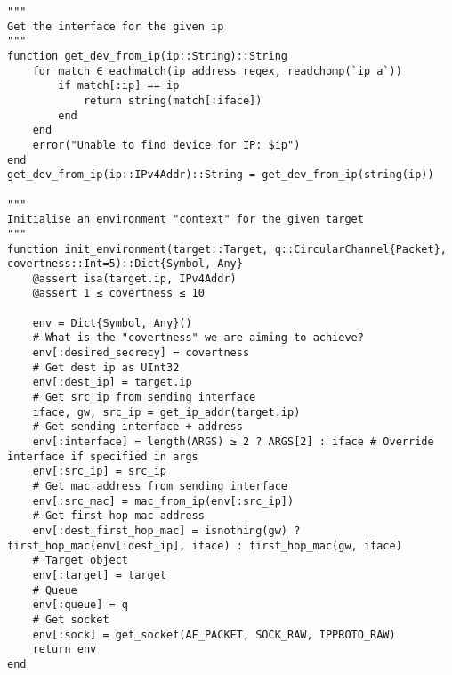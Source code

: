 \begin{lstlisting}[language=JuliaLocal, style=julia]
"""
Get the interface for the given ip
"""
function get_dev_from_ip(ip::String)::String
    for match ∈ eachmatch(ip_address_regex, readchomp(`ip a`))
        if match[:ip] == ip
            return string(match[:iface])
        end
    end
    error("Unable to find device for IP: $ip")
end
get_dev_from_ip(ip::IPv4Addr)::String = get_dev_from_ip(string(ip))

"""
Initialise an environment "context" for the given target
"""
function init_environment(target::Target, q::CircularChannel{Packet}, covertness::Int=5)::Dict{Symbol, Any}
    @assert isa(target.ip, IPv4Addr)
    @assert 1 ≤ covertness ≤ 10

    env = Dict{Symbol, Any}()
    # What is the "covertness" we are aiming to achieve?
    env[:desired_secrecy] = covertness
    # Get dest ip as UInt32
    env[:dest_ip] = target.ip
    # Get src ip from sending interface
    iface, gw, src_ip = get_ip_addr(target.ip)
    # Get sending interface + address
    env[:interface] = length(ARGS) ≥ 2 ? ARGS[2] : iface # Override interface if specified in args
    env[:src_ip] = src_ip
    # Get mac address from sending interface
    env[:src_mac] = mac_from_ip(env[:src_ip])
    # Get first hop mac address
    env[:dest_first_hop_mac] = isnothing(gw) ? first_hop_mac(env[:dest_ip], iface) : first_hop_mac(gw, iface)
    # Target object
    env[:target] = target
    # Queue
    env[:queue] = q
    # Get socket
    env[:sock] = get_socket(AF_PACKET, SOCK_RAW, IPPROTO_RAW)
    return env
end

\end{lstlisting}

